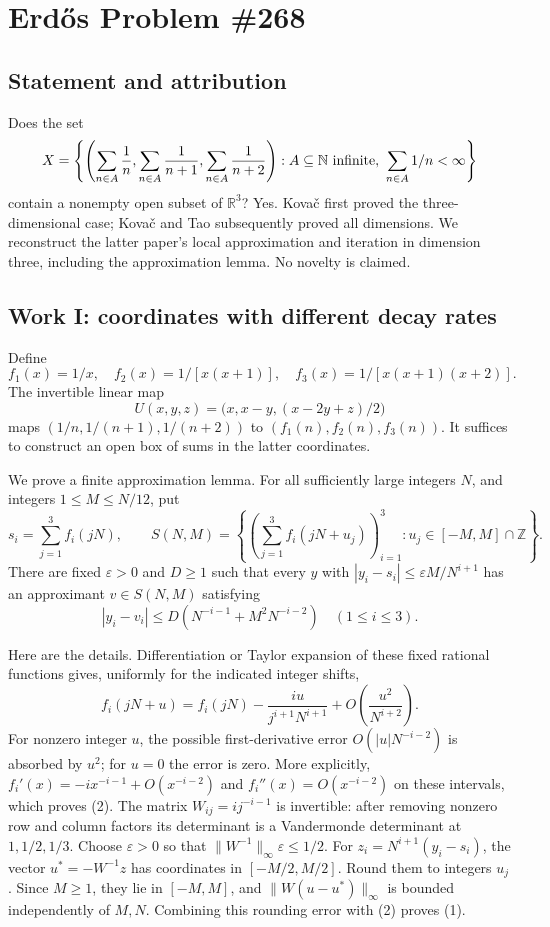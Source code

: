 \section{Erd\H{o}s Problem \#268}
\subsection{Statement and attribution}
Does the set
\[
 X=\left\{\left(\sum_{n\in A}\frac1n,
 \sum_{n\in A}\frac1{n+1},\sum_{n\in A}\frac1{n+2}\right):
 A\subseteq\mathbb N\hbox{ infinite},\ \sum_{n\in A}1/n<\infty\right\}
\]
contain a nonempty open subset of $\mathbb R^3$? Yes. Kova\v c first proved the three-dimensional case; Kova\v c and Tao subsequently proved all dimensions. We reconstruct the latter paper's local approximation and iteration in dimension three, including the approximation lemma. No novelty is claimed.

\subsection{Work I: coordinates with different decay rates}
Define
\[
 f_1(x)=1/x,\quad f_2(x)=1/[x(x+1)],\quad
 f_3(x)=1/[x(x+1)(x+2)].
\]
The invertible linear map
\[
 U(x,y,z)=\bigl(x,x-y,(x-2y+z)/2\bigr)
\]
maps $(1/n,1/(n+1),1/(n+2))$ to $(f_1(n),f_2(n),f_3(n))$. It suffices to construct an open box of sums in the latter coordinates.

We prove a finite approximation lemma. For all sufficiently large integers $N$, and integers $1\le M\le N/12$, put
\[
 s_i=\sum_{j=1}^3f_i(jN),\qquad
 S(N,M)=\left\{\left(\sum_{j=1}^3f_i(jN+u_j)\right)_{i=1}^3:
                   u_j\in[-M,M]\cap\mathbb Z\right\}.
\]
There are fixed $\varepsilon>0$ and $D\ge1$ such that every $y$ with
$|y_i-s_i|\le\varepsilon M/N^{i+1}$ has an approximant $v\in S(N,M)$ satisfying
\[
 |y_i-v_i|\le D\left(N^{-i-1}+M^2N^{-i-2}\right)
 \quad(1\le i\le3).
 \tag{1}
\]

Here are the details. Differentiation or Taylor expansion of these fixed rational functions gives, uniformly for the indicated integer shifts,
\[
 f_i(jN+u)=f_i(jN)-\frac{iu}{j^{i+1}N^{i+1}}
                  +O\left(\frac{u^2}{N^{i+2}}\right).
 \tag{2}
\]
For nonzero integer $u$, the possible first-derivative error $O(|u|N^{-i-2})$ is absorbed by $u^2$; for $u=0$ the error is zero. More explicitly, $f_i'(x)=-ix^{-i-1}+O(x^{-i-2})$ and $f_i''(x)=O(x^{-i-2})$ on these intervals, which proves (2).
The matrix $W_{ij}=ij^{-i-1}$ is invertible: after removing nonzero row and column factors its determinant is a Vandermonde determinant at $1,1/2,1/3$. Choose $\varepsilon>0$ so that $\|W^{-1}\|_\infty\varepsilon\le1/2$. For $z_i=N^{i+1}(y_i-s_i)$, the vector $u^*=-W^{-1}z$ has coordinates in $[-M/2,M/2]$. Round them to integers $u_j$. Since $M\ge1$, they lie in $[-M,M]$, and $\|W(u-u^*)\|_\infty$ is bounded independently of $M,N$. Combining this rounding error with (2) proves (1).


